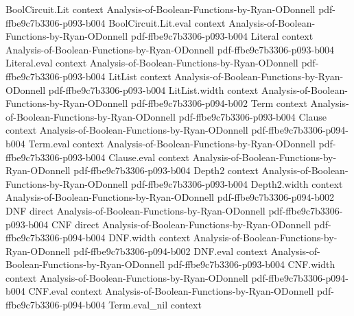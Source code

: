 \begin{lemma}
\leanok
{}
\proofstep
  {BoolCircuit.Lit}
  {context}
  {Analysis-of-Boolean-Functions-by-Ryan-ODonnell}
  {pdf-ffbe9c7b3306-p093-b004}
\proofstep
  {BoolCircuit.Lit.eval}
  {context}
  {Analysis-of-Boolean-Functions-by-Ryan-ODonnell}
  {pdf-ffbe9c7b3306-p093-b004}
\proofstep
  {Literal}
  {context}
  {Analysis-of-Boolean-Functions-by-Ryan-ODonnell}
  {pdf-ffbe9c7b3306-p093-b004}
\proofstep
  {Literal.eval}
  {context}
  {Analysis-of-Boolean-Functions-by-Ryan-ODonnell}
  {pdf-ffbe9c7b3306-p093-b004}
\proofstep
  {LitList}
  {context}
  {Analysis-of-Boolean-Functions-by-Ryan-ODonnell}
  {pdf-ffbe9c7b3306-p093-b004}
\proofstep
  {LitList.width}
  {context}
  {Analysis-of-Boolean-Functions-by-Ryan-ODonnell}
  {pdf-ffbe9c7b3306-p094-b002}
\proofstep
  {Term}
  {context}
  {Analysis-of-Boolean-Functions-by-Ryan-ODonnell}
  {pdf-ffbe9c7b3306-p093-b004}
\proofstep
  {Clause}
  {context}
  {Analysis-of-Boolean-Functions-by-Ryan-ODonnell}
  {pdf-ffbe9c7b3306-p094-b004}
\proofstep
  {Term.eval}
  {context}
  {Analysis-of-Boolean-Functions-by-Ryan-ODonnell}
  {pdf-ffbe9c7b3306-p093-b004}
\proofstep
  {Clause.eval}
  {context}
  {Analysis-of-Boolean-Functions-by-Ryan-ODonnell}
  {pdf-ffbe9c7b3306-p093-b004}
\proofstep
  {Depth2}
  {context}
  {Analysis-of-Boolean-Functions-by-Ryan-ODonnell}
  {pdf-ffbe9c7b3306-p093-b004}
\proofstep
  {Depth2.width}
  {context}
  {Analysis-of-Boolean-Functions-by-Ryan-ODonnell}
  {pdf-ffbe9c7b3306-p094-b002}
\proofstep
  {DNF}
  {direct}
  {Analysis-of-Boolean-Functions-by-Ryan-ODonnell}
  {pdf-ffbe9c7b3306-p093-b004}
\proofstep
  {CNF}
  {direct}
  {Analysis-of-Boolean-Functions-by-Ryan-ODonnell}
  {pdf-ffbe9c7b3306-p094-b004}
\proofstep
  {DNF.width}
  {context}
  {Analysis-of-Boolean-Functions-by-Ryan-ODonnell}
  {pdf-ffbe9c7b3306-p094-b002}
\proofstep
  {DNF.eval}
  {context}
  {Analysis-of-Boolean-Functions-by-Ryan-ODonnell}
  {pdf-ffbe9c7b3306-p093-b004}
\proofstep
  {CNF.width}
  {context}
  {Analysis-of-Boolean-Functions-by-Ryan-ODonnell}
  {pdf-ffbe9c7b3306-p094-b004}
\proofstep
  {CNF.eval}
  {context}
  {Analysis-of-Boolean-Functions-by-Ryan-ODonnell}
  {pdf-ffbe9c7b3306-p094-b004}
\proofstep
  {Term.eval_nil}
  {context}

\end{lemma}
